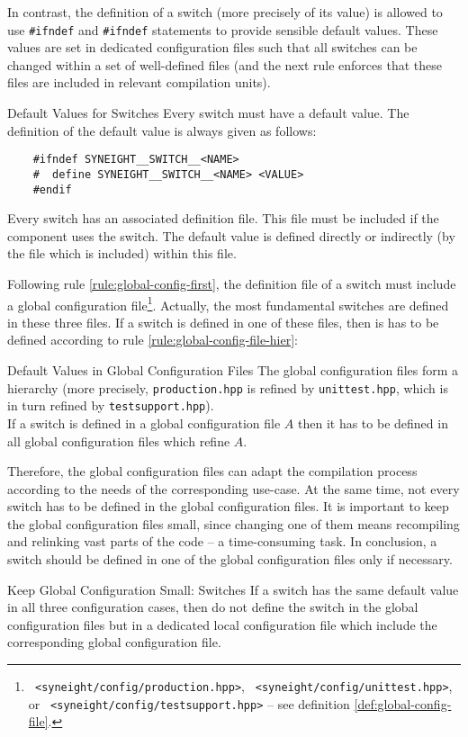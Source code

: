 In contrast, the definition of a switch (more precisely of its value)
is allowed to use {\tt \#ifndef} and {\tt \#ifndef} statements to
provide sensible default values. These values are set in dedicated
configuration files such that all switches can be changed within a set
of well-defined files (and the next rule enforces that these files are
included in relevant compilation units).
%
\begin{rule*}{Default Values for Switches}
  Every switch must have a default value. The definition of the
  default value is always given as follows:
  \begin{verbatim}
    #ifndef SYNEIGHT__SWITCH__<NAME>
    #  define SYNEIGHT__SWITCH__<NAME> <VALUE>
    #endif
  \end{verbatim}
  Every switch has an associated definition file. This file must be
  included if the component uses the switch. 
  The default value is defined directly or indirectly (by the file which
  is included) within this file.
\end{rule*}
%
Following rule \vref{rule:global-config-first}, the definition file of a
switch must include a global configuration file\footnote{ {\tt
    <syneight/config/production.hpp>}, {\tt
    <syneight/config/unittest.hpp>}, or {\tt
    <syneight/config/testsupport.hpp>} -- see definition
  \vref{def:global-config-file}.}.
%
Actually, the most fundamental switches are defined in these three
files. If a switch is defined in one of these files, then is has to be
defined according to rule  \vref{rule:global-config-file-hier}:
%
\begin{rule*}{Default Values in Global Configuration Files}
  The global configuration files form a hierarchy (more precisely,
  {\tt production.hpp} is refined by {\tt unittest.hpp}, which is in
  turn refined by {\tt testsupport.hpp}).\\
  If a switch is defined in a global configuration file $A$ then it
  has to be defined in all global configuration files which refine
  $A$.
\end{rule*}
%

Therefore, the global configuration files can adapt the compilation
process according to the needs of the corresponding use-case. At the same
time, not every switch has to be defined in the global configuration
files. It is important to keep the global configuration files small,
since changing one of them means recompiling and relinking vast parts
of the code -- a time-consuming task. In conclusion, a switch should
be defined in one of the global configuration files only if
necessary.
%
\begin{guideline*}{Keep Global Configuration Small: Switches}
  If a switch has the same default value in all three configuration
  cases, then do not define the switch in the global configuration
  files but in a dedicated local configuration file which include the
  corresponding global configuration file.
\end{guideline*}


